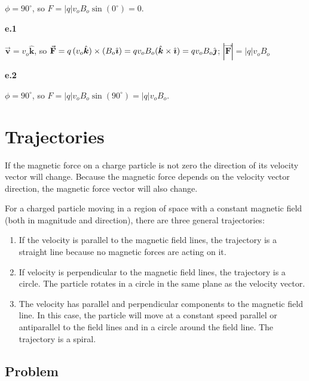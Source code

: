 \documentclass{article}
\newcommand{\ihat}[0]{\hat{\boldsymbol{\imath}}}
\newcommand{\jhat}[0]{\hat{\boldsymbol{\jmath}}}
\newcommand{\khat}[0]{\hat{\boldsymbol{k}}}
\newcommand{\bfvec}[1]{\vec{\mathbf{#1}}}
\begin{document}
\ifsolutions
$\phi=90^{\circ}$, so $F = |q|v_oB_o\sin(0^{\circ})=0$.
\else

\vskip 48pt
\fi
\ifsolutions\else
\vskip 48pt
\fi

{\bf e.1}

\ifsolutions
$\bfvec{v}=v_o\khat$, so $\bfvec{F} = q\thinspace (v_o\khat)\times (B_o\ihat)=qv_oB_o(\khat\times \ihat)=qv_oB_o\jhat$; $|\bfvec{F}|=|q|v_oB_o$
\else

\vskip 48pt
\fi
\ifsolutions\else
\vskip 48pt
\fi

{\bf e.2}

\ifsolutions
$\phi=90^{\circ}$, so $F = |q|v_oB_o\sin(90^{\circ})=|q|v_oB_o$.
\else

\newpage
\fi
\ifsolutions\else
\newpage
\fi

\section{Trajectories}

If the magnetic force on a charge particle is not zero the direction of its velocity vector will change. Because the magnetic force depends on the velocity vector direction, the magnetic force vector will also change.

For a charged particle moving in a region of space with a constant magnetic field (both in magnitude and direction), there are three general trajectories:

\begin{enumerate}

  \item If the velocity is parallel to the magnetic field lines, the trajectory is a straight line because no magnetic forces are acting on it.

  \item If velocity is perpendicular to the magnetic field lines, the trajectory is a circle. The particle rotates in a circle in the same plane as the velocity vector.

  \item The velocity has parallel and perpendicular components to the magnetic field line. In this case, the particle will move at a constant speed parallel or antiparallel to the field lines and in a circle around the field line. The trajectory is a spiral.

\end{enumerate}

\subsection{Problem}
\end{document}

